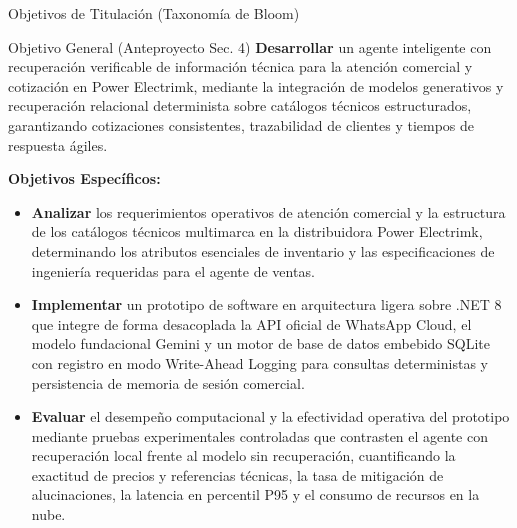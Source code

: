 \documentclass[aspectratio=169, 10pt]{beamer}
\begin{document}
\begin{frame}{Objetivos de Titulación (Taxonomía de Bloom)}
  \begin{block}{Objetivo General (Anteproyecto Sec. 4)}
    \textbf{Desarrollar} un agente inteligente con recuperación verificable de información técnica para la atención comercial y cotización en Power Electrimk, mediante la integración de modelos generativos y recuperación relacional determinista sobre catálogos técnicos estructurados, garantizando cotizaciones consistentes, trazabilidad de clientes y tiempos de respuesta ágiles.
  \end{block}
  
  \vspace{0.15cm}
  \textbf{Objetivos Específicos:}
  \begin{itemize}\footnotesize\setlength{\itemsep}{3pt}
    \item[\textbf{O1.}] \textbf{Analizar} los requerimientos operativos de atención comercial y la estructura de los catálogos técnicos multimarca en la distribuidora Power Electrimk, determinando los atributos esenciales de inventario y las especificaciones de ingeniería requeridas para el agente de ventas.
    \item[\textbf{O2.}] \textbf{Implementar} un prototipo de software en arquitectura ligera sobre .NET 8 que integre de forma desacoplada la API oficial de WhatsApp Cloud, el modelo fundacional Gemini y un motor de base de datos embebido SQLite con registro en modo Write-Ahead Logging para consultas deterministas y persistencia de memoria de sesión comercial.
    \item[\textbf{O3.}] \textbf{Evaluar} el desempeño computacional y la efectividad operativa del prototipo mediante pruebas experimentales controladas que contrasten el agente con recuperación local frente al modelo sin recuperación, cuantificando la exactitud de precios y referencias técnicas, la tasa de mitigación de alucinaciones, la latencia en percentil P95 y el consumo de recursos en la nube.
  \end{itemize}
\end{frame}
\end{document}
